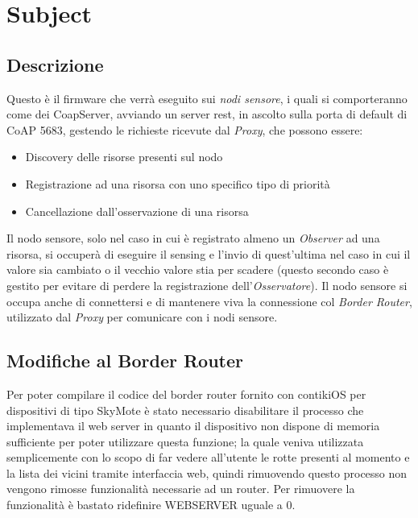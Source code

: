 \chapter{Subject}
  \section{Descrizione}
    Questo è il firmware che verrà eseguito sui \textit{nodi sensore}, i quali si comporteranno come dei CoapServer, avviando un server rest, in ascolto sulla porta di default
    di CoAP 5683, gestendo le richieste ricevute dal \textit{Proxy}, che possono essere:
    \begin{itemize}
      \item Discovery delle risorse presenti sul nodo
      \item Registrazione ad una risorsa con uno specifico tipo di priorità
      \item Cancellazione dall'osservazione di una risorsa
    \end{itemize}
    Il nodo sensore, solo nel caso in cui è registrato almeno un \textit{Observer} ad una risorsa, si occuperà di eseguire il sensing e l'invio di quest'ultima nel caso in cui
    il valore sia cambiato o il vecchio valore stia per scadere (questo secondo caso è gestito per evitare di perdere la registrazione dell'\textit{Osservatore}).\newline
    Il nodo sensore si occupa anche di connettersi e di mantenere viva la connessione col \textit{Border Router}, utilizzato dal \textit{Proxy} per comunicare con i nodi sensore.

  \section{Modifiche al Border Router}
    Per poter compilare il codice del border router fornito con contikiOS per dispositivi di tipo SkyMote è stato necessario disabilitare il processo che implementava il web server in quanto il dispositivo non dispone di
    memoria sufficiente per poter utilizzare questa funzione; la quale veniva utilizzata semplicemente con lo scopo di far vedere all'utente le rotte presenti al momento e la lista dei vicini tramite interfaccia web,
    quindi rimuovendo questo processo non vengono rimosse funzionalità necessarie ad un router.\newline
    Per rimuovere la funzionalità è bastato ridefinire WEBSERVER uguale a 0.
    

